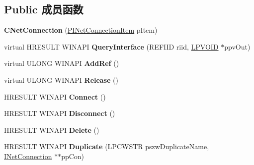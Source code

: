 \subsection*{Public 成员函数}
\begin{DoxyCompactItemize}
\item 
\mbox{\label{class_c_net_connection_a8dffdbce14d9fd0175f460eebeec9d6d}} 
{\bfseries C\+Net\+Connection} (\hyperlink{structtag_i_net_connection_item}{P\+I\+Net\+Connection\+Item} p\+Item)
\item 
\mbox{\label{class_c_net_connection_a96875b3819f177de1607be61e6467cf7}} 
virtual H\+R\+E\+S\+U\+LT W\+I\+N\+A\+PI {\bfseries Query\+Interface} (R\+E\+F\+I\+ID riid, \hyperlink{interfacevoid}{L\+P\+V\+O\+ID} $\ast$ppv\+Out)
\item 
\mbox{\label{class_c_net_connection_a3c24544a5bf973d320c344c7820f6acb}} 
virtual U\+L\+O\+NG W\+I\+N\+A\+PI {\bfseries Add\+Ref} ()
\item 
\mbox{\label{class_c_net_connection_a633e88b5ef754f4b4e5e47ae266e9a54}} 
virtual U\+L\+O\+NG W\+I\+N\+A\+PI {\bfseries Release} ()
\item 
\mbox{\label{class_c_net_connection_ac51ca1592b0454ff4f19ed647254df35}} 
H\+R\+E\+S\+U\+LT W\+I\+N\+A\+PI {\bfseries Connect} ()
\item 
\mbox{\label{class_c_net_connection_a42fe49fdcf8facf6bece14447f6d684f}} 
H\+R\+E\+S\+U\+LT W\+I\+N\+A\+PI {\bfseries Disconnect} ()
\item 
\mbox{\label{class_c_net_connection_a6cc982992160538ba9584b8a58457b9f}} 
H\+R\+E\+S\+U\+LT W\+I\+N\+A\+PI {\bfseries Delete} ()
\item 
\mbox{\label{class_c_net_connection_a9ea440ad9e4591051e1a75e344c622d8}} 
H\+R\+E\+S\+U\+LT W\+I\+N\+A\+PI {\bfseries Duplicate} (L\+P\+C\+W\+S\+TR pszw\+Duplicate\+Name, \hyperlink{interface_i_net_connection}{I\+Net\+Connection} $\ast$$\ast$pp\+Con)
\item 
\mbox{\label{class_c_net_connection_aeadfbc99a3ce5f0b150573f623983e24}} 
$$
\end{DoxyCompactItemize}
